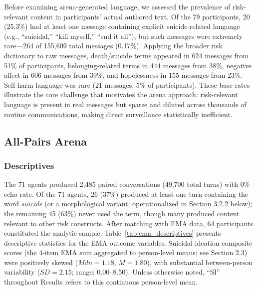 \documentclass[review,12pt,authoryear]{elsarticle}
\begin{document}
Before examining arena-generated language, we assessed the prevalence of risk-relevant content in participants' actual authored text. Of the 79 participants, 20 (25.3\%) had at least one message containing explicit suicide-related language (e.g., ``suicidal,'' ``kill myself,'' ``end it all''), but such messages were extremely rare---264 of 155,609 total messages (0.17\%). Applying the broader risk dictionary to raw messages, death/suicide terms appeared in 624 messages from 51\% of participants, belonging-related terms in 444 messages from 38\%, negative affect in 606 messages from 39\%, and hopelessness in 155 messages from 23\%. Self-harm language was rare (21 messages, 5\% of participants). These base rates illustrate the core challenge that motivates the arena approach: risk-relevant language is present in real messages but sparse and diluted across thousands of routine communications, making direct surveillance statistically inefficient.

\subsection{All-Pairs Arena}

\subsubsection{Descriptives}

The 71 agents produced 2,485 paired conversations (49,700 total turns) with 0\% echo rate. Of the 71 agents, 26 (37\%) produced at least one turn containing the word \textit{suicide} (or a morphological variant; operationalized in Section 3.2.2 below); the remaining 45 (63\%) never used the term, though many produced content relevant to other risk constructs. After matching with EMA data, 64 participants constituted the analytic sample. Table~\ref{tab:ema_descriptives} presents descriptive statistics for the EMA outcome variables. Suicidal ideation composite scores (the 4-item EMA sum aggregated to person-level means; see Section 2.3) were positively skewed ($Mdn = 1.18$, $M = 1.80$), with substantial between-person variability ($SD = 2.15$; range: 0.00--8.50). Unless otherwise noted, ``SI'' throughout Results refers to this continuous person-level mean.
\end{document}
